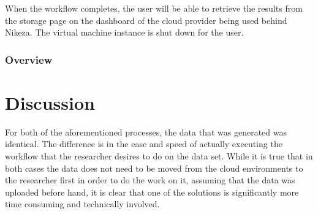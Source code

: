 When the workflow completes, the user will be able to retrieve the results from the storage page on the dashboard of the cloud provider being used behind Nikeza. The virtual machine instance is shut down for the user.

\subsubsection{Overview}


\begin{table}[ht!]
\caption[Step Differences between Nikeza and Amazon AWS]{The differences between steps needed to complete the work task using OpenStack with Nikeza and Amazon AWS.}
\label{tab:comparison_overview}
\end{table}

\section{Discussion}
For both of the aforementioned processes, the data that was generated was identical. The difference is in the ease and speed of actually executing the workflow that the researcher desires to do on the data set. While it is true that in both cases the data does not need to be moved from the cloud environments to the researcher first in order to do the work on it, assuming that the data was uploaded before hand, it is clear that one of the solutions is significantly more time consuming and technically involved. 

